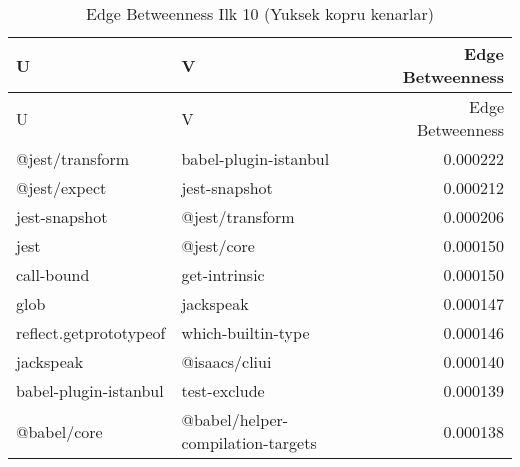\begin{longtable}{l l r}
\caption{Edge Betweenness Ilk 10 (Yuksek kopru kenarlar)}\\
\toprule
U & V & Edge Betweenness \\
\midrule
\endfirsthead
\toprule
U & V & Edge Betweenness \\
\midrule
\endhead
\bottomrule
\endfoot
\bottomrule
\endlastfoot
@jest/transform & babel-plugin-istanbul & 0.000222 \\
@jest/expect & jest-snapshot & 0.000212 \\
jest-snapshot & @jest/transform & 0.000206 \\
jest & @jest/core & 0.000150 \\
call-bound & get-intrinsic & 0.000150 \\
glob & jackspeak & 0.000147 \\
reflect.getprototypeof & which-builtin-type & 0.000146 \\
jackspeak & @isaacs/cliui & 0.000140 \\
babel-plugin-istanbul & test-exclude & 0.000139 \\
@babel/core & @babel/helper-compilation-targets & 0.000138 \\
\end{longtable}
